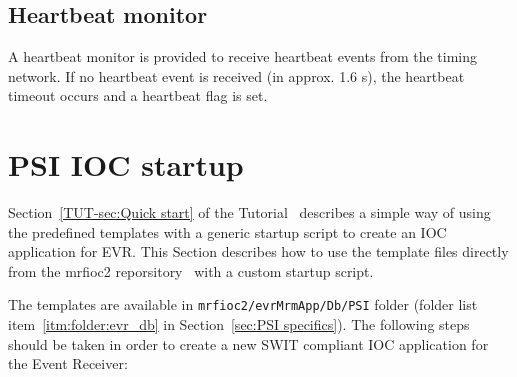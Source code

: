 \documentclass[12pt,a4paper]{article}
\let\stdsection\section
\renewcommand\section{\newpage\stdsection}
\begin{document}
\subsection{Heartbeat monitor}\label{sec:Heartbeat monitor}
A heartbeat monitor is provided to receive heartbeat events from the timing network. If no heartbeat event is received (in approx. 1.6 s), the heartbeat timeout occurs and a heartbeat flag is set. 


\section{PSI IOC startup}\label{sec:PSI IOC startup}
Section~\ref{TUT-sec:Quick start} of the Tutorial~\cite{tutorial} describes a simple way of using the predefined templates with a generic startup script to create an IOC application for EVR. This Section describes how to use the template files directly from the mrfioc2 reporsitory~\cite{git_mrfioc2} with a custom startup script.

The templates are available in \texttt{mrfioc2/evrMrmApp/Db/PSI} folder (folder list item~\ref{itm:folder:evr_db} in Section~\ref{sec:PSI specifics}). The following steps should be taken in order to create a new SWIT compliant IOC application for the Event Receiver:
\end{document}
